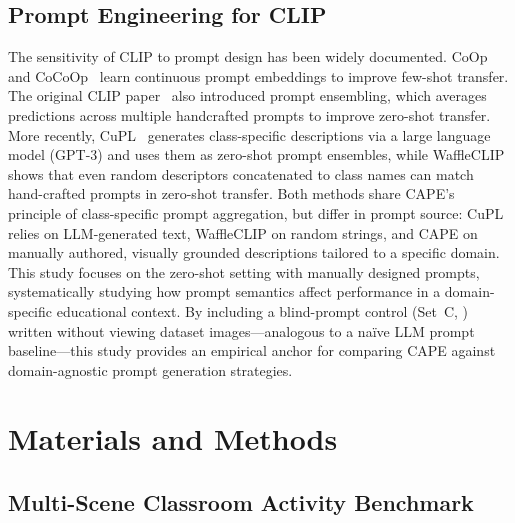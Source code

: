 \documentclass[symmetry,article,submit,pdftex,moreauthors]{Definitions/mdpi}
\begin{document}
\subsection{Prompt Engineering for CLIP}

The sensitivity of CLIP to prompt design has been widely documented.
CoOp~\cite{zhou2022learning} and CoCoOp~\cite{zhou2022conditional} learn continuous prompt embeddings to improve few-shot transfer.
The original CLIP paper~\cite{radford2021learning} also introduced prompt ensembling, which averages predictions across multiple handcrafted prompts to improve zero-shot transfer.
More recently, CuPL~\cite{pratt2023cupl} generates class-specific descriptions via a large language model (GPT-3) and uses them as zero-shot prompt ensembles, while WaffleCLIP~\cite{roth2023waffleclip} shows that even random descriptors concatenated to class names can match hand-crafted prompts in zero-shot transfer.
Both methods share CAPE's principle of class-specific prompt aggregation, but differ in prompt source: CuPL relies on LLM-generated text, WaffleCLIP on random strings, and CAPE on manually authored, visually grounded descriptions tailored to a specific domain.
This study focuses on the zero-shot setting with manually designed prompts, systematically studying how prompt semantics affect performance in a domain-specific educational context.
By including a blind-prompt control (Set~C, ) written without viewing dataset images---analogous to a na\"ive LLM prompt baseline---this study provides an empirical anchor for comparing CAPE against domain-agnostic prompt generation strategies.


\section{Materials and Methods}
\label{sec:method}

\subsection{Multi-Scene Classroom Activity Benchmark}
\label{sec:dataset}
\end{document}
